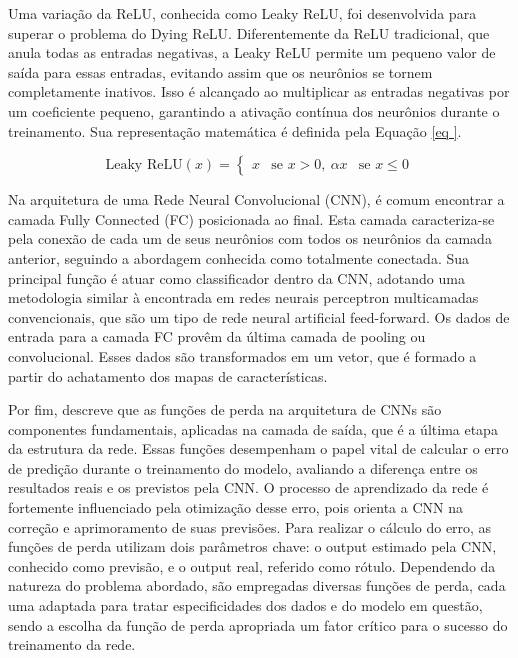 Uma variação da ReLU, conhecida como Leaky ReLU, foi desenvolvida para superar o problema do Dying ReLU. Diferentemente da ReLU tradicional, que anula todas as entradas negativas, a Leaky ReLU permite um pequeno valor de saída para essas entradas, evitando assim que os neurônios se tornem completamente inativos. Isso é alcançado ao multiplicar as entradas negativas por um coeficiente pequeno, garantindo a ativação contínua dos neurônios durante o treinamento. Sua representação matemática é definida pela Equação \ref{eq
}.

\begin{equation}
\text{Leaky ReLU}(x) = \begin{cases}
x & \text{se } x > 0, \
\alpha x & \text{se } x \leq 0
\end{cases}
\label{eq
}
\end{equation}

Na arquitetura de uma Rede Neural Convolucional (CNN), é comum encontrar a camada Fully Connected (FC) posicionada ao final. Esta camada caracteriza-se pela conexão de cada um de seus neurônios com todos os neurônios da camada anterior, seguindo a abordagem conhecida como totalmente conectada. Sua principal função é atuar como classificador dentro da CNN, adotando uma metodologia similar à encontrada em redes neurais perceptron multicamadas convencionais, que são um tipo de rede neural artificial feed-forward. Os dados de entrada para a camada FC provêm da última camada de pooling ou convolucional. Esses dados são transformados em um vetor, que é formado a partir do achatamento dos mapas de características.

Por fim, \textcite{Alzubaidi2021} descreve que as funções de perda na arquitetura de CNNs são componentes fundamentais, aplicadas na camada de saída, que é a última etapa da estrutura da rede. Essas funções desempenham o papel vital de calcular o erro de predição durante o treinamento do modelo, avaliando a diferença entre os resultados reais e os previstos pela CNN. O processo de aprendizado da rede é fortemente influenciado pela otimização desse erro, pois orienta a CNN na correção e aprimoramento de suas previsões. Para realizar o cálculo do erro, as funções de perda utilizam dois parâmetros chave: o output estimado pela CNN, conhecido como previsão, e o output real, referido como rótulo. Dependendo da natureza do problema abordado, são empregadas diversas funções de perda, cada uma adaptada para tratar especificidades dos dados e do modelo em questão, sendo a escolha da função de perda apropriada um fator crítico para o sucesso do treinamento da rede.

